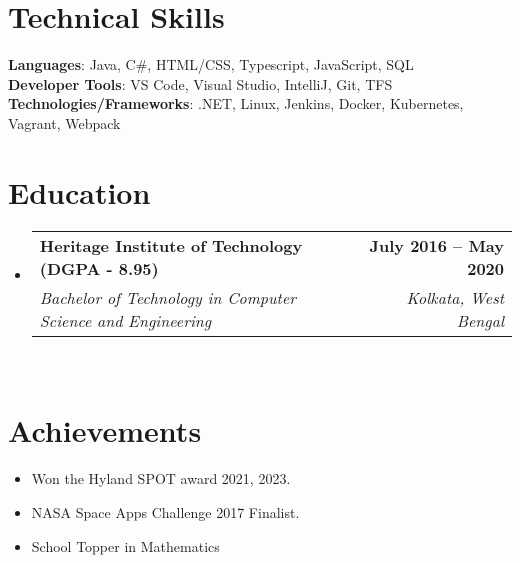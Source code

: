 \documentclass[letterpaper,11pt]{article}
\makeatletter
\newcommand{\resumeItem}[1]{
  \item\small{
    {#1 \vspace{-2pt}}
  }
}
\newcommand{\resumeSubheading}[4]{
  \vspace{-2pt}\item
    \begin{tabular*}{1.0\textwidth}[t]{l@{\extracolsep{\fill}}r}
      \textbf{#1} & \textbf{\small #2} \\
      \textit{\small#3} & \textit{\small #4} \\
    \end{tabular*}\vspace{-7pt}
}
\newcommand{\resumeSubItem}[1]{\resumeItem{#1}\vspace{-4pt}}
\newcommand{\resumeSubHeadingListStart}{\begin{itemize}[leftmargin=0.0in, label={}]}
\newcommand{\resumeSubHeadingListEnd}{\end{itemize}}
\newcommand{\resumeItemListStart}{\begin{itemize}}
\newcommand{\resumeItemListEnd}{\end{itemize}\vspace{-5pt}}
\makeatother
\begin{document}
%
\section{Technical Skills}
 \begin{itemize}[leftmargin=0.15in, label={}]
    \small{\item{
     \textbf{Languages}{:  Java, C\#, HTML/CSS, Typescript, JavaScript, SQL} \\
     \textbf{Developer Tools}{: VS Code, Visual Studio, IntelliJ, Git, TFS} \\
     \textbf{Technologies/Frameworks}{: .NET, Linux, Jenkins, Docker, Kubernetes, Vagrant, Webpack} \\
    }}
 \end{itemize}
 \vspace{-16pt}

 
\section{Education}
  \resumeSubHeadingListStart
    \resumeSubheading
      {Heritage Institute of Technology (DGPA - 8.95) }{July 2016 -- May 2020}
      {Bachelor of Technology in Computer Science and Engineering} {Kolkata, West Bengal} \\
   
  \resumeSubHeadingListEnd



\section{Achievements}
    \resumeItemListStart
        \resumeSubItem{Won the Hyland SPOT award 2021, 2023.}
        \resumeSubItem{NASA Space Apps Challenge 2017 Finalist.}
        \resumeSubItem{School Topper in Mathematics}
   
    \resumeItemListEnd
\end{document}
